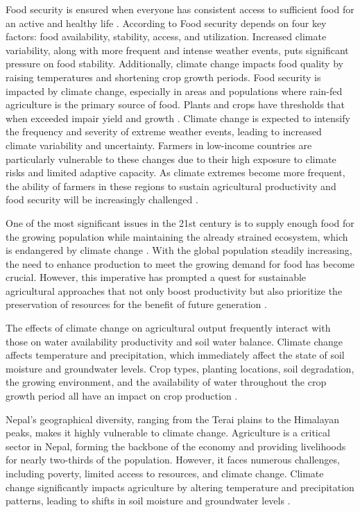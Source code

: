 Food security is ensured when everyone has consistent access to sufficient food for an active and healthy life \citep{mulunehImpactClimateChange2021}. According to \citet{kangClimateChangeImpacts2009} Food security depends on four key factors: food availability, stability, access, and utilization. Increased climate variability, along with more frequent and intense weather events, puts significant pressure on food stability. Additionally, climate change impacts food quality by raising temperatures and shortening crop growth periods. Food security is impacted by climate change, especially in areas and populations where rain-fed agriculture is the primary source of food. Plants and crops have thresholds that when exceeded impair yield and growth \citep{mulunehImpactClimateChange2021}. Climate change is expected to intensify the frequency and severity of extreme weather events, leading to increased climate variability and uncertainty. Farmers in low-income countries are particularly vulnerable to these changes due to their high exposure to climate risks and limited adaptive capacity.  As climate extremes become more frequent, the ability of farmers in these regions to sustain agricultural productivity and food security will be increasingly challenged \citep{budhathokiAssessingFarmersPreparedness2020}. 

One of the most significant issues in the 21st century is to supply enough food for the growing population while maintaining the already strained ecosystem, which is endangered by climate change \citep{kangClimateChangeImpacts2009}. With the global population steadily increasing, the need to enhance production to meet the growing demand for food has become crucial. However, this imperative has prompted a quest for sustainable agricultural approaches that not only boost productivity but also prioritize the preservation of resources for the benefit of future generation \citep{singhSocioeconomicStatusQualitative2022}. 

The effects of climate change on agricultural output frequently interact with those on water availability productivity and soil water balance. Climate change affects temperature and precipitation, which immediately affect the state of soil moisture and groundwater levels. Crop types, planting locations, soil degradation, the growing environment, and the availability of water throughout the crop growth period all have an impact on crop production \citep{risalImpactClimateChange2022}.

Nepal's geographical diversity, ranging from the Terai plains to the Himalayan peaks, makes it highly vulnerable to climate change. Agriculture is a critical sector in Nepal, forming the backbone of the economy and providing livelihoods for nearly two-thirds of the population. However, it faces numerous challenges, including poverty, limited access to resources, and climate change. Climate change significantly impacts agriculture by altering temperature and precipitation patterns, leading to shifts in soil moisture and groundwater levels \citep{gyawaliOverviewAgricultureNepal2021}.

